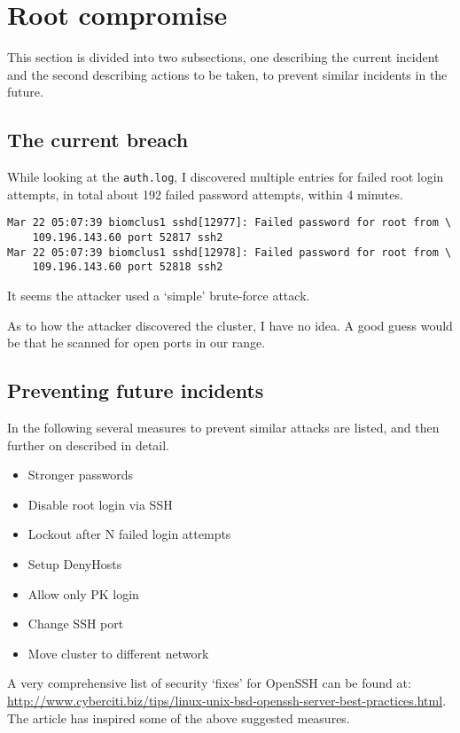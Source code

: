 \section{Root compromise}
This section is divided into two subsections, one describing the current
incident and the second describing actions to be taken, to prevent similar
incidents in the future.

\subsection{The current breach}
While looking at the \texttt{auth.log}, I discovered multiple entries for
failed root login attempts, in total about 192 failed password attempts,
within 4 minutes.

\begin{verbatim}
Mar 22 05:07:39 biomclus1 sshd[12977]: Failed password for root from \
    109.196.143.60 port 52817 ssh2
Mar 22 05:07:39 biomclus1 sshd[12978]: Failed password for root from \
    109.196.143.60 port 52818 ssh2
\end{verbatim}

It seems the attacker used a `simple' brute-force attack. 

As to how the attacker discovered the cluster, I have no idea. A good guess
would be that he scanned for open ports in our range.

\subsection{Preventing future incidents}
In the following several measures to prevent similar attacks are listed, and
then further on described in detail.

\begin{itemize}
\item Stronger passwords
\item Disable root login via SSH
\item Lockout after N failed login attempts
\item Setup DenyHosts
\item Allow only PK login
\item Change SSH port
\item Move cluster to different network
\end{itemize}

A very comprehensive list of security `fixes' for OpenSSH can be found at:
\href{http://www.cyberciti.biz/tips/linux-unix-bsd-openssh-server-best-practices.html}
     {http://www.cyberciti.biz/tips/linux-unix-bsd-openssh-server-best-practices.html}.
The article has inspired some of the above suggested measures.

